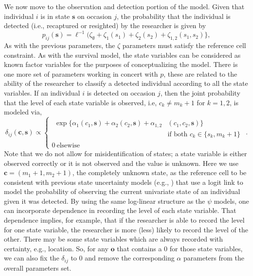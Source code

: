 \documentclass[fleqn]{article}
\newcommand{\bs}{\ensuremath{\mathbf{s}}}
\newcommand{\bc}{\ensuremath{\mathbf{c}}}
\newcommand{\bo}{\ensuremath{\mathbf{o}}}
\begin{document}
We now move to the observation and detection portion of the model. Given that individual $i$ is in state $\bs$ on occasion $j$, the probability that the individual is detected (i.e., recaptured or resighted) by the researcher is given by
\begin{equation}
p_{ij}(\bs) = \ell^{-1}(\zeta_\emptyset + \zeta_1(s_1) + \zeta_2(s_2) + \zeta_{1,2}(s_1,s_2)\},
\end{equation}
As with the previous parameters, the $\zeta$ parameters must satisfy the reference cell constraint. As with the survival model, the state variables can be considered as known factor variables for the purposes of conceptualizing the model. There is one more set of parameters working in concert with $p$, these are related to the ability of the researcher to classify a detected individual according to all the state variables. If an individual $i$ is detected on occasion $j$, then the joint probability that the level of each state variable is observed, i.e, $c_k \ne m_k+1$ for $k=1,2$, is modeled via,
\begin{equation}
\delta_{ij}(\bc,\bs) \propto \left\{
\begin{array}{l}
\begin{split}
\exp\{\alpha_1(c_1,\bs) + \alpha_2(c_2,\bs) + \alpha_{1,2}&(c_1,c_2,\bs)\} \\
&\mbox{if both } c_k\in\{s_k,m_k+1\}
\end{split}\\
0 \ \mbox{elsewise} 
\end{array}
\right. .
\end{equation}
Note that we do not allow for misidentification of states; a state variable is either observed correctly or it is not observed and the value is unknown. Here we use $\bc = (m_1+1,m_2+1)$, the completely unknown state, as the reference cell to be consistent with previous state uncertainty models (e.g., \citealt{Laake:2013ab,kendall2012estimating}) that use a logit link to model the probability of observing the current univariate state of an individual given it was detected. By using the same log-linear structure as the $\psi$ models, one can incorporate dependence in recording the level of each state variable. That dependence implies, for example, that if the researcher is able to record the level for one state variable, the researcher is more (less) likely to record the level of the other. There may be some state variables which are always recorded with certainty, e.g., location. So, for any $\bo$ that contains a 0 for those state variables, we can also fix the $\delta_{ij}$ to 0 and remove the corresponding $\alpha$ parameters from the overall parameters set. 
\end{document}
